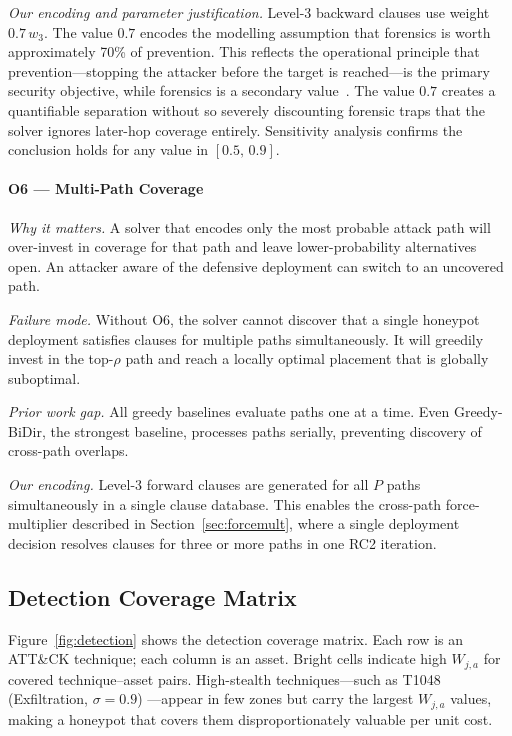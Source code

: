 \documentclass[journal]{IEEEtran}
\begin{document}
\textit{Our encoding and parameter justification.}
Level-3 backward clauses use weight $0.7\,w_3$. The value $0.7$
encodes the modelling assumption that forensics is worth approximately
70\% of prevention. This reflects the operational principle that
prevention---stopping the attacker before the target is reached---is
the primary security objective, while forensics is a secondary
value~\cite{hutchins2011}. The value $0.7$ creates a quantifiable
separation without so severely discounting forensic traps that the
solver ignores later-hop coverage entirely. Sensitivity analysis
confirms the conclusion holds for any value in $[0.5,\,0.9]$.

\paragraph{O6 --- Multi-Path Coverage}
\textit{Why it matters.}
A solver that encodes only the most probable attack path will
over-invest in coverage for that path and leave lower-probability
alternatives open. An attacker aware of the defensive deployment can
switch to an uncovered path.

\textit{Failure mode.}
Without O6, the solver cannot discover that a single honeypot
deployment satisfies clauses for multiple paths simultaneously. It
will greedily invest in the top-$\rho$ path and reach a locally
optimal placement that is globally suboptimal.

\textit{Prior work gap.}
All greedy baselines evaluate paths one at a time. Even Greedy-BiDir,
the strongest baseline, processes paths serially, preventing
discovery of cross-path overlaps.

\textit{Our encoding.}
Level-3 forward clauses are generated for all $P$ paths
simultaneously in a single clause database. This enables the
cross-path force-multiplier described in Section~\ref{sec:forcemult},
where a single deployment decision resolves clauses for three or more
paths in one RC2 iteration.

\subsection{Detection Coverage Matrix}
\label{sec:model:matrix}

Figure~\ref{fig:detection} shows the detection coverage matrix. Each
row is an ATT\&CK technique; each column is an asset. Bright cells
indicate high $W_{j,a}$ for covered technique--asset pairs.
High-stealth techniques---such as T1048 (Exfiltration, $\sigma=0.9$)
---appear in few zones but carry the largest $W_{j,a}$ values,
making a honeypot that covers them disproportionately valuable per
unit cost.
\end{document}
